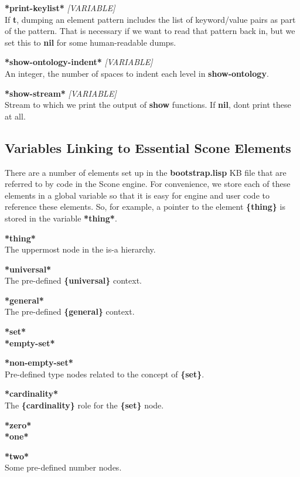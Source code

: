 \documentclass[titlepage,twoside,openright,11pt]{article}
\begin{document}
\textbf{*print-keylist*} \emph{{[}VARIABLE{]}}\\
If \textbf{t}, dumping an element pattern includes the list of
keyword/value pairs as part of the pattern. That is necessary if we want
to read that pattern back in, but we set this to \textbf{nil} for some
human-readable dumps.

\textbf{*show-ontology-indent*} \emph{{[}VARIABLE{]}}\\
An integer, the number of spaces to indent each level in
\textbf{show-ontology}.

\textbf{*show-stream*} \emph{{[}VARIABLE{]}}\\
Stream to which we print the output of \textbf{show} functions. If
\textbf{nil}, don\textquotesingle t print these at all.

\subsection{Variables Linking to Essential Scone
Elements}\label{variables-linking-to-essential-scone-elements}

There are a number of elements set up in the \textbf{bootstrap.lisp} KB
file that are referred to by code in the Scone engine. For convenience,
we store each of these elements in a global variable so that it is easy
for engine and user code to reference these elements. So, for example, a
pointer to the element \textbf{\{thing\}} is stored in the variable
\textbf{*thing*}.

\textbf{*thing*\\
}The uppermost node in the is-a hierarchy.

\textbf{*universal*\\
}The pre-defined \textbf{\{universal\}} context.

\textbf{*general*\\
}The pre-defined \textbf{\{general\}} context.

\textbf{*set*\\
*empty-set*}

\textbf{*non-empty-set*\\
}Pre-defined type nodes related to the concept of \textbf{\{set\}}.

\textbf{*cardinality*\\
}The \textbf{\{cardinality\}} role for the \textbf{\{set\}} node.

\textbf{*zero*\\
*one*}

\textbf{*two*\\
}Some pre-defined number nodes.
\end{document}
